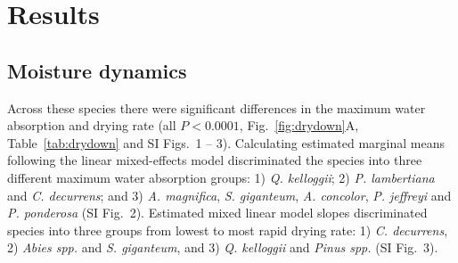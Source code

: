 \documentclass[letterpaper,12pt]{article}
\begin{document}
\section*{Results}

\subsection*{Moisture dynamics}

Across these species there were significant differences in the maximum water
absorption and drying rate (all $P < 0.0001$, Fig.~\ref{fig:drydown}A,
Table~\ref{tab:drydown} and SI Figs.~1 -- 3). Calculating estimated marginal
means following the linear mixed-effects model discriminated the species into
three different maximum water absorption groups: 1) \emph{Q. kelloggii}; 2)
\emph{P. lambertiana} and \emph{C. decurrens}; and 3) \emph{A. magnifica},
\emph{S. giganteum}, \emph{A. concolor}, \emph{P. jeffreyi} and \emph{P.
  ponderosa} (SI Fig.~2). Estimated mixed linear model slopes discriminated
species into three groups from lowest to most rapid drying rate: 1) \emph{C.
  decurrens}, 2) \emph{Abies spp.} and \emph{S. giganteum}, and 3) \emph{Q.
  kelloggii} and \emph{Pinus spp.} (SI Fig.~3).
\end{document}
